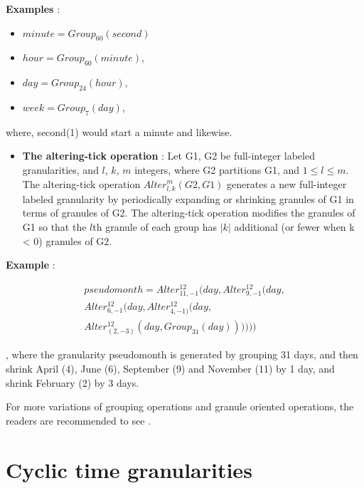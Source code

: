 \documentclass[12pt]{article}
\providecommand{\tightlist}{%
  \setlength{\itemsep}{0pt}\setlength{\parskip}{0pt}}
\begin{document}
\textbf{Examples} :

\begin{itemize}
\tightlist
\item
  \(minute = Group_{60}(second)\)
\item
  \(hour = Group_{60}(minute)\),
\item
  \(day = Group_{24}(hour)\),
\item
  \(week = Group_{7}(day)\),
\end{itemize}

where, second(1) would start a minute and likewise.

\begin{itemize}
\tightlist
\item
  \textbf{The altering-tick operation} : Let G1, G2 be full-integer labeled granularities, and \(l\), \(k\), \(m\) integers, where G2 partitions G1, and \(1 \leq l \leq m\). The altering-tick operation \(Alter^{m}_{l,k} (G2, G1)\) generates a new full-integer labeled granularity by periodically expanding or shrinking granules of G1 in terms of granules of G2. The altering-tick operation modifies the granules of G1 so that the \(l\)th granule of each group has \(|k|\) additional (or fewer when k \textless{} 0) granules of G2.
\end{itemize}

\textbf{Example} :

\begin{equation*}
\begin{split}
pseudomonth = Alter^{12}_{11,-1}(day, Alter^{12}_{9,-1}(day, \\
  Alter^{12}_{6,-1}(day, Alter^{12}_{4,-1)}(day, \\
  Alter^{12}_{(2,-3)}(day, Group_{31}(day))))))
\end{split}
\end{equation*}

, where the granularity pseudomonth is generated by grouping 31 days, and then shrink April (4), June (6), September (9) and November (11) by 1 day, and shrink February (2) by 3 days. \citep{Ning2002-tf}

For more variations of grouping operations and granule oriented operations, the readers are recommended to see \citet{Ning2002-tf}.

\hypertarget{sec:cyclic-gran}{%
\section{Cyclic time granularities}\label{sec:cyclic-gran}}
\end{document}
